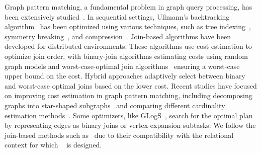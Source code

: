 



 Graph pattern matching, a fundamental problem in graph query processing, has been extensively studied~\cite{angles2017foundations}. In sequential settings, Ullmann's backtracking algorithm~\cite{ullmann1976algorithm} has been optimized using various techniques, such as tree indexing~\cite{shang2008quicksi}, symmetry breaking~\cite{han13turbo}, and compression~\cite{bi2016efficient}. 
Join-based algorithms have been developed for distributed environments. These algorithms use cost estimation to optimize join order, with binary-join algorithms\cite{lai2015scalable, lai2019distributed} estimating costs using random graph models and worst-case-optimal join algorithms~\cite{ammar2018distributed} ensuring a worst-case upper bound on the cost. Hybrid approaches\cite{mhedhbi2019optimizing, huge} adaptively select between binary and worst-case optimal joins based on the lower cost. Recent studies have focused on improving cost estimation in graph pattern matching, including decomposing graphs into star-shaped subgraphs~\cite{cset} and comparing different cardinality estimation methods~\cite{gcare}. Some optimizers, like GLogS~\cite{GLogS}, search for the optimal plan by representing edges as binary joins or vertex-expansion subtasks. %
We follow the join-based methods such as~\cite{huge,GLogS} due to their compatibility with the relational context for which \name~ is designed. %


